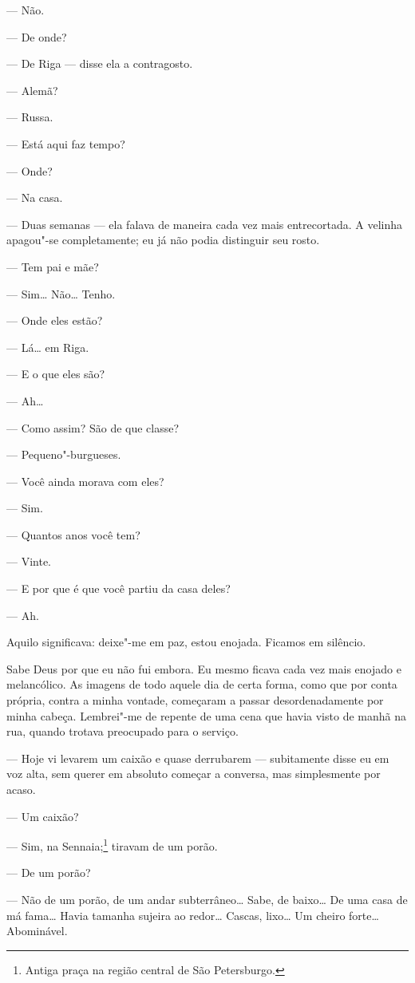 --- Não.

--- De onde?

--- De Riga --- disse ela a contragosto.

--- Alemã?

--- Russa.

--- Está aqui faz tempo?

--- Onde?

--- Na casa.

--- Duas semanas --- ela falava de maneira cada vez mais entrecortada. A
velinha apagou"-se completamente; eu já não podia distinguir seu rosto.

--- Tem pai e mãe?

--- Sim\ldots{} Não\ldots{} Tenho.

--- Onde eles estão?

--- Lá\ldots{} em Riga.

--- E o que eles são?

--- Ah\ldots{}

--- Como assim? São de que classe?

--- Pequeno"-burgueses.

--- Você ainda morava com eles?

--- Sim.

--- Quantos anos você tem?

--- Vinte.

--- E por que é que você partiu da casa deles?

--- Ah.

Aquilo significava: deixe"-me em paz, estou enojada. Ficamos em silêncio.

Sabe Deus por que eu não fui embora. Eu mesmo ficava cada vez mais
enojado e melancólico. As imagens de todo aquele dia de certa forma,
como que por conta própria, contra a minha vontade, começaram a passar
desordenadamente por minha cabeça. Lembrei"-me de repente de uma cena
que havia visto de manhã na rua, quando trotava preocupado para o
serviço.

--- Hoje vi levarem um caixão e quase derrubarem --- subitamente disse eu em
voz alta, sem querer em absoluto começar a conversa, mas simplesmente
por acaso.

--- Um caixão?

--- Sim, na Sennaia;\footnote{ Antiga praça na região central de São
Petersburgo.} tiravam de um porão.

--- De um porão?

--- Não de um porão, de um andar subterrâneo\ldots{} Sabe, de baixo\ldots{} De uma
casa de má fama\ldots{} Havia tamanha sujeira ao redor\ldots{} Cascas, lixo\ldots{} Um
cheiro forte\ldots{} Abominável.

